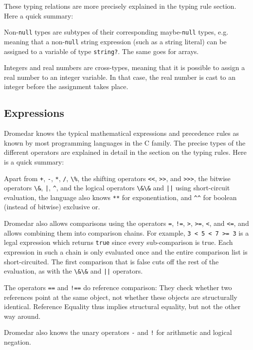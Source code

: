 \documentclass{article}
\newcommand{\code}[1]{\lstinline[columns=fixed]{#1}}
\begin{document}
				These typing relations are more precisely explained in the typing rule section. Here a quick summary:
				
				Non-\code{null} types are subtypes of their corresponding maybe-\code{null} types, e.g. meaning that a non-\code{null} string expression (such as a string literal) can be assigned to a variable of type \code{string?}. The same goes for arrays.
				
				Integers and real numbers are cross-types, meaning that it is possible to assign a real number to an integer variable. In that case, the real number is cast to an integer before the assignment takes place.
			
		\subsection{Expressions}
		
			Dromedar knows the typical mathematical expressions and precedence rules as known by most programming languages in the C family. The precise types of the different operators are explained in detail in the section on the typing rules. Here is a quick summary:
			
			Apart from \code{+}, \code{-}, \code{*}, \code{/}, \code{\%}, the shifting operators \code{<<}, \code{>>}, and \code{>>>}, the bitwise operators \code{\&}, \code{|}, \code{^}, and the logical operators \code{\&\&} and \code{||} using short-circuit evaluation, the language also knows \code{**} for exponentiation, and \code{^}\code{^} for boolean (instead of bitwise) exclusive or.
			
			Dromedar also allows comparisons using the operators \code{=}, \code{!=}, \code{>}, \code{>=}, \code{<}, and \code{<=}, and allows combining them into comparison chains. For example, \code{3 < 5 < 7 >= 3} is a legal expression which returns \code{true} since every sub-comparison is true. Each expression in such a chain is only evaluated once and the entire comparison list is short-circuited. The first comparison that is false cuts off the rest of the evaluation, as with the \code{\&\&} and \code{||} operators.
			
			The operators \code{==} and \code{!==} do reference comparison: They check whether two references point at the same object, not whether these objects are structurally identical. Reference Equality thus implies structural equality, but not the other way around.
			
			Dromedar also knows the unary operators \code{-} and \code{!} for arithmetic and logical negation.
			
\end{document}
